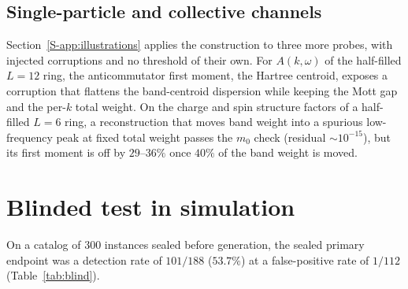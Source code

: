 \documentclass[aps,prb,reprint,onecolumn,12pt,superscriptaddress,longbibliography,floatfix]{revtex4-2}
\begin{document}
\subsection{Single-particle and collective channels}
\label{sec:otherprobes}
Section~\ref{S-app:illustrations} applies the construction to three more probes, with injected corruptions and no threshold of their own. For $A(k,\omega)$ of the half-filled $L=12$ ring, the anticommutator first moment, the Hartree centroid, exposes a corruption that flattens the band-centroid dispersion while keeping the Mott gap and the per-$k$ total weight. On the charge and spin structure factors of a half-filled $L=6$ ring, a reconstruction that moves band weight into a spurious low-frequency peak at fixed total weight passes the $m_0$ check (residual $\sim\!10^{-15}$), but its first moment is off by $29$--$36\%$ once $40\%$ of the band weight is moved.

\section{Blinded test in simulation}
\label{sec:blind}
On a catalog of $300$ instances sealed before generation, the sealed primary endpoint was a detection rate of $101/188$ ($53.7\%$) at a false-positive rate of $1/112$ (Table~\ref{tab:blind}).
\end{document}
